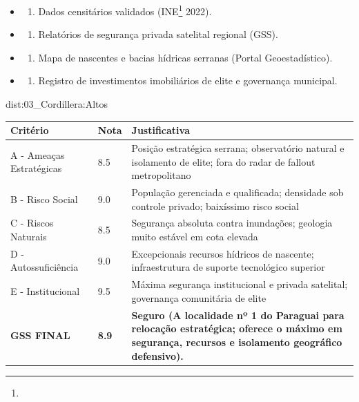 {\begin{itemize}
\tightlist
\item
  \begin{enumerate}
  \def\labelenumi{\arabic{enumi})}
  \tightlist
  \item
    Dados censitários validados (INE\footnote{\fineINE} 2022).
  \end{enumerate}
\item
  \begin{enumerate}
  \def\labelenumi{\arabic{enumi})}
  \setcounter{enumi}{1}
  \tightlist
  \item
    Relatórios de segurança privada satelital regional (GSS).
  \end{enumerate}
\item
  \begin{enumerate}
  \def\labelenumi{\arabic{enumi})}
  \setcounter{enumi}{2}
  \tightlist
  \item
    Mapa de nascentes e bacias hídricas serranas (Portal
    Geoestadístico).
  \end{enumerate}
\item
  \begin{enumerate}
  \def\labelenumi{\arabic{enumi})}
  \setcounter{enumi}{3}
  \tightlist
  \item
    Registro de investimentos imobiliários de elite e governança
    municipal.
  \end{enumerate}
\end{itemize}}{dist:03_Cordillera:Altos}
\begin{table}[ht!]
\small \begin{tabular}{p{3.0cm}p{0.8cm}p{6.0cm}} \toprule
\textbf{Critério} & \textbf{Nota} & \textbf{Justificativa} \\ \midrule
A - Ameaças Estratégicas & 8.5 & Posição estratégica serrana; observatório natural e isolamento de elite; fora do radar de fallout metropolitano \\
B - Risco Social & 9.0 & População gerenciada e qualificada; densidade sob controle privado; baixíssimo risco social \\
C - Riscos Naturais & 8.5 & Segurança absoluta contra inundações; geologia muito estável em cota elevada \\
D - Autossuficiência & 9.0 & Excepcionais recursos hídricos de nascente; infraestrutura de suporte tecnológico superior \\
E - Institucional & 9.5 & Máxima segurança institucional e privada satelital; governança comunitária de elite \\
\midrule \textbf{GSS FINAL} & \textbf{8.9} & \textbf{Seguro (A localidade nº 1 do Paraguai para relocação estratégica; oferece o máximo em segurança, recursos e isolamento geográfico defensivo).} \\ \bottomrule \end{tabular}
\end{table}
